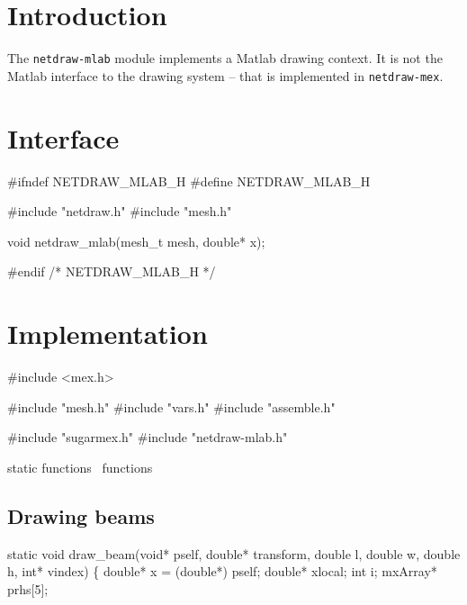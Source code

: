 
\section{Introduction}

The {\tt{}netdraw-mlab} module implements a Matlab drawing context.
It is not the Matlab interface to the drawing system -- that is
implemented in {\tt{}netdraw-mex}.


\section{Interface}

\endmoddef
#ifndef NETDRAW_MLAB_H
#define NETDRAW_MLAB_H

#include "netdraw.h"
#include "mesh.h"

void netdraw_mlab(mesh_t mesh, double* x);

#endif /* NETDRAW_MLAB_H */
\nwendcode{}\nwdocspar


\section{Implementation}

\nwenddocs{}\endmoddef
#include <mex.h>

#include "mesh.h"
#include "vars.h"
#include "assemble.h"

#include "sugarmex.h"
#include "netdraw-mlab.h"

\LA{}static functions~{\nwtagstyle{}}\RA{}
\LA{}functions~{\nwtagstyle{}}\RA{}
\nwendcode{}\nwdocspar


\subsection{Drawing beams}

\nwenddocs{}\endmoddef
static void draw_beam(void* pself, double* transform,
                      double l, double w, double h,
                      int* vindex)
\{
    double* x = (double*) pself;
    double* xlocal;
    int i;
    mxArray* prhs[5];

